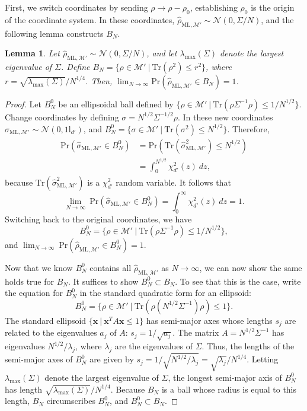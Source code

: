 \documentclass[aps,pra, twocolumn]{revtex4-1}
\newcommand{\M}{\mathcal{M}}
\newcommand{\Id}{\mathbb{I}}
\def\Id{1\!\mathrm{l}}
\newcommand{\rhohat}{\hat{\rho}}
\newcommand{\rhoML}[1]{\rhohat_{\scriptscriptstyle{\mathrm{ML},#1}}}
\newtheorem{lem}{Lemma}
\begin{document}
First, we switch coordinates by sending $\rho \rightarrow \rho - \rho_{0}$, establishing $\rho_{0}$ is the origin of the coordinate system. In these coordinates, $\rhoML{\M'} \sim \mathcal{N}(0, \Sigma/N)$, and the following lemma constructs $B_{N}$.

\begin{lem}
\label{eq:lem}
Let $\rhoML{\M'} \sim \mathcal{N}(0, \Sigma/N)$, and let $\lambda_{\max}(\Sigma)$ denote the largest eigenvalue of $\Sigma$. Define $B_{N} = \{\rho \in \M' ~|~\mathrm{Tr}(\rho^{2}) \leq r^{2}\}$, where $r = \sqrt{\lambda_{\max}(\Sigma)}/N^{1/4}$. Then, $\lim_{N \rightarrow \infty} \mathrm{Pr}(\rhoML{\M'} \in B_{N}) =1$.
\end{lem}

\begin{proof}
Let $B^{0}_{N}$ be an ellipsoidal ball defined by $\{\rho \in \M'~|~\mathrm{Tr}(\rho \Sigma^{-1} \rho) \leq 1/N^{1/2}\}$. Change coordinates by defining $\sigma = N^{1/2}\Sigma^{-1/2}\rho$. In these new coordinates $\hat{\sigma}_{\mathrm{ML},\M'} \sim \mathcal{N}(0, \Id_{d'})$, and $B^{0}_{N} = \{\sigma \in \M'~|~\mathrm{Tr}(\sigma^{2}) \leq N^{1/2}\}$. Therefore,
\begin{align*}
\mathrm{Pr}(\hat{\sigma}_{\mathrm{ML},\M'} \in B^{0}_{N}) &= \mathrm{Pr}(\mathrm{Tr}(\hat{\sigma}_{\mathrm{ML},\M'}^{2}) \leq N^{1/2})\\
&= \int_{0}^{N^{1/2}}\chi^{2}_{d'}(z)~dz,
\end{align*}
because $\mathrm{Tr}(\hat{\sigma}_{\mathrm{ML},\M'}^{2})$ is a $\chi^{2}_{d'}$ random variable. It follows that
\[\lim_{N \rightarrow \infty}~\mathrm{Pr}(\hat{\sigma}_{\mathrm{ML},\M'} \in B^{0}_{N})  =\int_{0}^{\infty}\chi^{2}_{d'}(z)~dz =1.\]
Switching back to the original coordinates, we have
\[B^{0}_{N} = \{\rho \in \M'~|~\mathrm{Tr}(\rho \Sigma^{-1} \rho) \leq 1/N^{1/2}\},\]
and $\lim_{N \rightarrow \infty}~\mathrm{Pr}(\rhoML{\M'} \in B^{0}_{N}) = 1$.

Now that we know $B^{0}_{N}$ contains all  $\rhoML{\M'}$ as $N\rightarrow \infty$, we can now show the same holds true for $B_{N}$. It suffices to show $B^{0}_{N} \subset B_{N}$. To see that this is the case, write the equation for $B^{0}_{N}$ in the standard quadratic form for an ellipsoid:
\[B^{0}_{N} = \{\rho \in \M'~|~\mathrm{Tr}(\rho ( N^{1/2}\Sigma^{-1} ) \rho) \leq 1\}.\]
The standard ellipsoid $\{\mathbf{x}~|~\mathbf{x}^{T}A\mathbf{x} \leq 1\}$ has semi-major axes whose lengths $s_{j}$ are related to the eigenvalues $a_{j}$ of $A$: $s_{j} = 1/\sqrt{a_{j}}$. The matrix $A = N^{1/2}\Sigma^{-1}$ has eigenvalues $N^{1/2}/\lambda_{j}$, where $\lambda_{j}$ are the eigenvalues of $\Sigma$. Thus, the lengths of the semi-major axes of $B^{0}_{N}$ are given by $s_{j} = 1/\sqrt{N^{1/2}/\lambda_{j}} = \sqrt{\lambda_{j}}/N^{1/4}$. Letting $\lambda_{\max}(\Sigma)$ denote the largest eigenvalue of $\Sigma$, the longest semi-major axis of $B^{0}_{N}$ has length $\sqrt{\lambda_{\max}(\Sigma)}/N^{1/4}$.
Because $B_{N}$ is a ball whose radius is equal to this length, $B_{N}$ circumscribes $B^{0}_{N}$, and $B^{0}_{N} \subset B_{N}$.


\end{proof}
\end{document}
